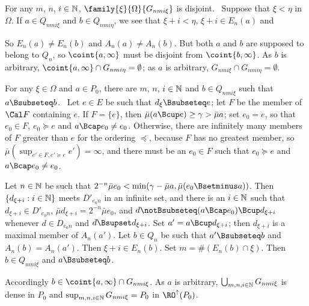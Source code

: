 {

\medskip

 For any $m$, $n$, $i\in\Bbb N$,
$\family{\xi}{\Omega}{G_{nmi\xi}}$ is disjoint.   \Prf\ Suppose that
$\xi<\eta$ in $\Omega$.   If $a\in Q_{nmi\xi}$ and $b\in Q_{nmi\eta}$,
we see that $\xi+i<\eta$, $\xi+i\in E_n(a)$ and


\noindent So $E_n(a)\ne E_n(b)$ and $A_n(a)\ne A_n(b)$.   But both $a$ and
$b$ are supposed to belong to $Q_n$, so $\coint{a,\infty}$ must be disjoint
from $\coint{b,\infty}$.
As $b$ is arbitrary, $\coint{a,\infty}\cap G_{nmi\eta}=\emptyset$;
as $a$ is arbitrary, $G_{nmi\xi}\cap G_{nmi\eta}=\emptyset$.\ \Qed

\medskip

 For any $\xi\in\Omega$ and $a\in P_0$, there are $m$, $n$,
$i\in\Bbb N$ and $b\in Q_{nmi\xi}$ such that $a\Bsubseteq b$.
\Prf\ Let $e\in E$ be such that $d_{\xi}\Bsubseteq e$;  let $F$ be the
member of $\Cal F$ containing $e$.   If $F=\{e\}$, then
$\bar\mu(a\Bcup e)\ge\gamma>\bar\mu a$;  set $e_0=e$, so that
$e_0\in F$, $e_0\succcurlyeq e$ and $a\Bcap e_0\ne e_0$.   Otherwise,
there are infinitely many members of $F$ greater than $e$ for the ordering
$\preccurlyeq$, because $F$ has no greatest member, so
$\bar\mu(\sup_{e'\in F,e'\succcurlyeq e}e')=\infty$, and there must be
an $e_0\in F$ such that $e_0\succcurlyeq e$ and $a\Bcap e_0\ne e_0$.

Let $n\in\Bbb N$ be such that
$2^{-n}\bar\mu e_0<\min(\gamma-\bar\mu a,\bar\mu(e_0\Bsetminus a))$.
Then $\{d_{\xi+i}:i\in\Bbb N\}$ meets $D'_{e_0n}$ in an infinite set, and
there is an $i\in\Bbb N$ such that
$d_{\xi+i}\in D'_{e_0n}$, $\bar\mu d_{\xi+i}=2^{-n}\bar\mu e_0$,
and $d\notBsubseteq(a\Bcap e_0)\Bcup d_{\xi+i}$ whenever $d\in D_{e_0n}$
and $d\Bsupset d_{\xi+i}$.   Set $a'=a\Bcup d_{\xi+i}$;  then
$d_{\xi+i}$ is a maximal member of $A_n(a')$.   Let $b\in Q_n$ be such that
$a'\Bsubseteq b$ and $A_n(b)=A_n(a')$.   Then $\xi+i\in E_n(b)$.
Set $m=\#(E_n(b)\cap\xi)$.   Then $b\in Q_{nmi\xi}$ and
$a\Bsubseteq b$.\ \Qed

Accordingly $b\in\coint{a,\infty}\cap G_{nmi\xi}$.
As $a$ is arbitrary, $\bigcup_{m,n,i\in\Bbb N}G_{nmi\xi}$ is dense in $P_0$
and $\sup_{m,n,i\in\Bbb N}G_{nmi\xi}=P_0$ in $\RO^{\uparrow}(P_0)$.

\medskip

}
